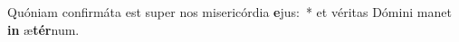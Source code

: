 \item Quóniam confirmáta est super nos misericórdia \textbf{e}jus:~* et véritas Dómini manet \textbf{in} æ\textbf{tér}num.
